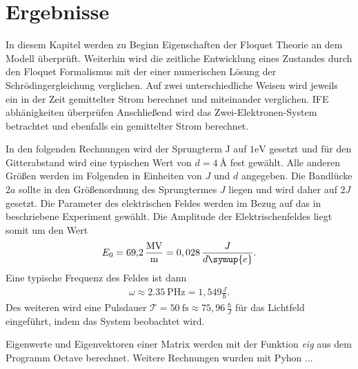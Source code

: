 \chapter{Ergebnisse}
\label{sec:ergebnisse}
In diesem Kapitel werden zu Beginn
Eigenschaften der Floquet Theorie an dem Modell überprüft.
Weiterhin wird die zeitliche Entwicklung
eines Zustandes durch den
Floquet Formalismus mit der einer numerischen Lösung der
Schrödingergleichung verglichen.
Auf zwei unterschiedliche Weisen wird jeweils ein in der Zeit
gemittelter Strom berechnet und miteinander verglichen.
IFE abhänigkeiten überprüfen
Anschließend wird das Zwei-Elektronen-System betrachtet und ebenfalls ein gemittelter Strom berechnet.

In den folgenden Rechnungen wird der Sprungterm J auf $1\si{\electronvolt}$ gesetzt und
für den Gitterabstand wird eine typischen Wert von $d=\SI{4}{\angstrom}$ fest gewählt.
Alle anderen Größen werden im Folgenden in Einheiten von $J$ und $d$ angegeben.
Die Bandlücke $2a$ sollte in den Größenordnung des Sprungtermes $J$ liegen und wird
daher auf $2J$ gesetzt.
Die Parameter des elektrischen Feldes werden im Bezug auf das in \cite{jackl} beschriebene Experiment gewählt.
Die Amplitude der Elektrischenfeldes liegt somit um den Wert
\begin{align}
  E_0=\SI{69,2}{\mega\volt\per\meter}=0,028\, \frac{J}{d\symup{e}}.
\end{align}
Eine typische Frequenz des Feldes ist dann
\begin{align}
  \omega\approx\SI{2,35}{\peta\hertz}=1,549\frac{J}{\hbar}.
\end{align}
Des weiteren wird eine Pulsdauer $\mathcal{T}=\SI{50}{\femto\second}\approx75,96\,\frac{\hbar}{J}$
für das Lichtfeld eingeführt, indem das System beobachtet wird.

Eigenwerte und Eigenvektoren einer Matrix werden mit der Funktion \textit{eig} aus dem Programm Octave \cite{octave}
berechnet. Weitere Rechnungen wurden mit Pyhon ...



